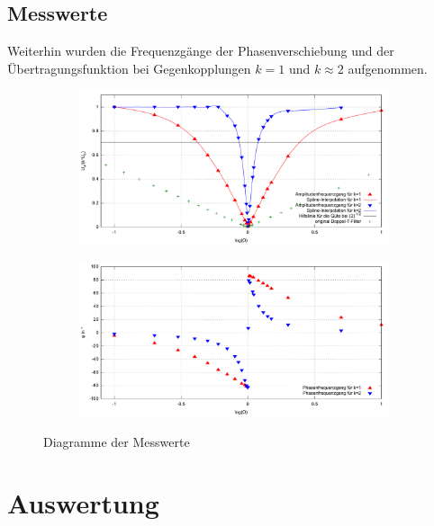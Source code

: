 \documentclass[numbers=noenddot,12pt,a4paper]{scrartcl}
\begin{document}
\subsection{Messwerte}
Weiterhin wurden die Frequenzgänge der Phasenverschiebung und der Übertragungsfunktion bei Gegenkopplungen $k=1$ und $k\approx2$ aufgenommen.
\begin{figure}[H]
\centering
\begin{subfigure}[b]{\textwidth}
\includegraphics[width=\textwidth]{sfg.pdf}
 \label{img:sfg}
\end{subfigure}
\begin{subfigure}[b]{\textwidth}
\includegraphics[width=\textwidth]{pfg.pdf}
\end{subfigure}
\caption{Diagramme der Messwerte}
\end{figure}
\section{Auswertung}
\end{document}
